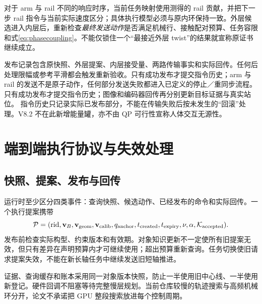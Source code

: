 \documentclass[UTF8,11pt,a4paper,fontset=fandol]{ctexart}
\numberwithin{equation}{section}
\theoremstyle{definition}
\begin{document}
对于 arm 与 rail 不同的响应时序，当前任务映射使用测得的 rail 贡献，并把下一步 rail 指令与当前实际速度区分；具体执行模型必须与原内环保持一致。外层候选进入内层后，重新检查\emph{最终发送动作}是否满足机械行、接触配对预算、任务容限和式\eqref{eq:phasecoupling}。不能仅锁住一个“最接近外层 twist”的结果就宣称原证书继续成立。

发布记录包含原快照、外层提案、内层接受量、两路传输事实和实际回传。任何后处理限幅或参考平滑都会触发重新验收。只有成功发布才提交指令历史；arm 与 rail 的发送不是原子动作，任何部分发送失败都进入已定义的停止／重同步流程。只有成功发布才提交指令历史；图像和编码器回传再分别更新目标证据与真实站位。 指令历史只记录实际已发布部分，不能在传输失败后按未发生的“回滚”处理。V8.2 不在此新增能量罐，亦不由 QP 可行性宣称人体交互无源性。


\section{端到端执行协议与失效处理}
\label{sec:runtime}
\subsection{快照、提案、发布与回传}
运行时至少区分四类事件：查询快照、候选动作、已经发布的命令和实际回传。一个执行提案携带
\begin{equation}
\mathcal P=(\mathrm{rid},\mathbf v_B,\mathbf v_{
\rm geom},\mathbf v_{\rm calib},q_{\rm anchor},t_{\rm created},t_{\rm expiry},\nu,\alpha,\mathcal K_{\rm accepted}).
\label{eq:proposal}
\end{equation}
发布前检查实际构型、约束版本和有效期。对象知识更新不一定使所有旧提案无效，但只有差异在声明预算内才可继续使用；超出预算重新查询。任务切换使旧请求提案失效，不能在新长轴任务中继续发送旧短轴推进。

证据、查询缓存和账本采用同一对象版本快照，防止一半使用旧中心线、一半使用新登记。硬件回调不阻塞等待完整慢层规划。当前仓库较慢的轨迹搜索与高频机械环分开，论文不承诺把 GPU 整段搜索放进每个控制周期。
\end{document}
